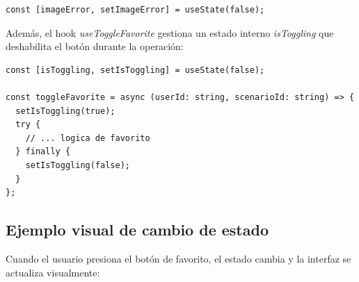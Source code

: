 \begin{lstlisting}
const [imageError, setImageError] = useState(false);
\end{lstlisting}

Adem\'as, el hook \textit{useToggleFavorite} gestiona un estado interno
\textit{isToggling} que deshabilita el bot\'on durante la operaci\'on:

\begin{lstlisting}
const [isToggling, setIsToggling] = useState(false);

const toggleFavorite = async (userId: string, scenarioId: string) => {
  setIsToggling(true);
  try {
    // ... logica de favorito
  } finally {
    setIsToggling(false);
  }
};
\end{lstlisting}

\subsection{Ejemplo visual de cambio de estado}

Cuando el usuario presiona el bot\'on de favorito, el estado cambia y
la interfaz se actualiza visualmente:

\begin{center}
\end{center}
